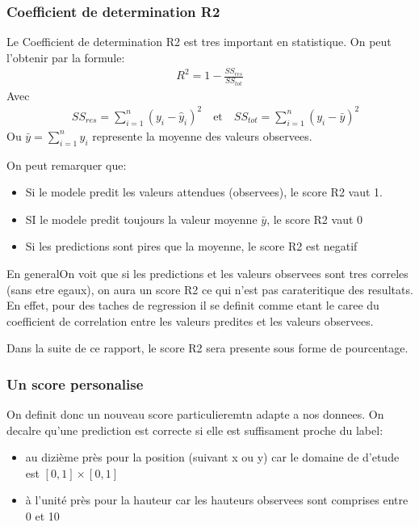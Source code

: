 \subsubsection{Coefficient de determination R2}
\label{subsub:R2}
Le Coefficient de determination R2 est tres important en statistique. On peut l'obtenir par la formule:
\begin{align}
 R^2 = 1 - \frac{SS_{res}}{SS_{tot}}
 \label{eqn:R2}
\end{align}
Avec
\begin{align*}
 \quad SS_{res} =  \sum_{i=1}^{n} \left( y_i - \hat{y}_i \right)^2 \quad \text{et} \quad SS_{tot} =  \sum_{i=1}^{n} \left( y_i - \bar{y} \right)^2 
\end{align*}
Ou $ \bar{y} = \sum_{i=1}^{n} y_i $ represente la moyenne des valeurs observees.

On peut remarquer que:
\begin{itemize}
 \item Si le modele predit les valeurs attendues (observees), le score R2 vaut 1. 
 \item SI le modele predit toujours la valeur moyenne $\bar{y}$, le score R2 vaut 0
 \item Si les predictions sont pires que la moyenne, le score R2 est negatif
\end{itemize}

En generalOn voit que si les predictions et les valeurs observees sont tres correles (sans etre egaux), on aura un score R2 ce qui n'est pas carateritique des resultats. En effet, pour des taches de regression il se definit comme etant le caree du coefficient de correlation entre les valeurs predites et les valeurs observees.

Dans la suite de ce rapport, le score R2 sera presente sous forme de pourcentage. 

\subsubsection{Un score personalise}
On definit donc un nouveau score particulieremtn adapte a nos donnees. On decalre qu'une prediction est correcte si elle est suffisament proche du label:
\begin{itemize}
 \item au dizième près pour la position (suivant x ou y) car le domaine de d'etude est $[0,1] \times [0,1]$
 \item à l'unité près pour la hauteur car les hauteurs observees sont comprises entre 0 et 10
\end{itemize}

